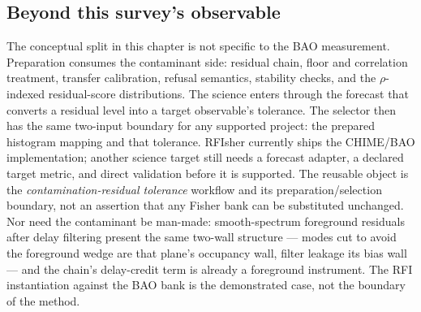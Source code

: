 \subsection*{Beyond this survey's observable}

The conceptual split in this chapter is not specific to the BAO measurement.
Preparation consumes the contaminant side: residual chain, floor and correlation
treatment, transfer calibration, refusal semantics, stability checks, and the
$\rho$-indexed residual-score distributions. The science enters through the
forecast that converts a residual level into a target observable's tolerance.
The selector then has the same two-input boundary for any supported project:
the prepared histogram mapping and that tolerance. RFIsher currently ships the
CHIME/BAO implementation; another science target still needs a forecast
adapter, a declared target metric, and direct validation before it is
supported. The reusable object is the \emph{contamination-residual tolerance}
workflow and its preparation/selection boundary, not an assertion that any
Fisher bank can be substituted unchanged.
Nor need the contaminant be man-made:
smooth-spectrum foreground residuals after delay filtering present the same
two-wall structure --- modes cut to avoid the foreground wedge are that
plane's occupancy wall, filter leakage its bias wall --- and the chain's
delay-credit term is already a foreground instrument.  The RFI
instantiation against the BAO bank is the demonstrated case, not the
boundary of the method.
